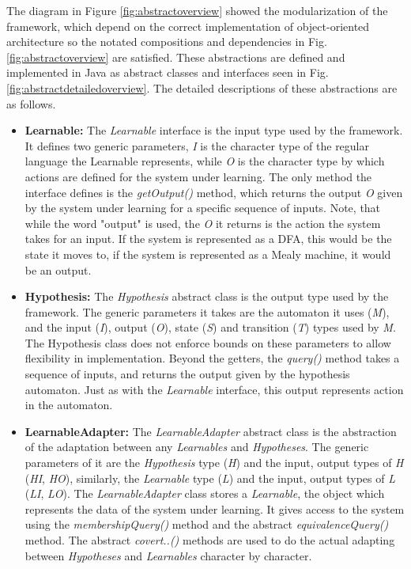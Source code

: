 The diagram in Figure \ref{fig:abstractoverview} showed the modularization of the framework, which depend on the correct implementation of object-oriented architecture so the notated compositions and dependencies in Fig. \ref{fig:abstractoverview} are satisfied. These abstractions are defined and implemented in Java as abstract classes and interfaces seen in Fig. \ref{fig:abstractdetailedoverview}. The detailed descriptions of these abstractions are as follows.
\\
\begin{itemize}
	\item \textbf{Learnable:} The \emph{Learnable} interface is the input type used by the framework. It defines two generic parameters, \emph{I} is the character type of the regular language the Learnable represents, while \emph{O} is the character type by which actions are defined for the system under learning. The only method the interface defines is the \emph{getOutput()} method, which returns the output \emph{O} given by the system under learning for a specific sequence of inputs. Note, that while the word "output" is used, the \emph{O} it returns is the action the system takes for an input. If the system is represented as a DFA, this would be the state it moves to, if the system is represented as a Mealy machine, it would be an output.
	
	\item \textbf{Hypothesis:} The \emph{Hypothesis} abstract class is the output type used by the framework. The generic parameters it takes are the automaton it uses (\emph{M}), and the input (\emph{I}), output (\emph{O}), state (\emph{S}) and transition (\emph{T}) types used by \emph{M}. The Hypothesis class does not enforce bounds on these parameters to allow flexibility in implementation. Beyond the getters, the \emph{query()} method takes a sequence of inputs, and returns the output given by the hypothesis automaton. Just as with the \emph{Learnable} interface, this output represents action in the automaton.
	
	\item \textbf{LearnableAdapter:} The \emph{LearnableAdapter} abstract class is the abstraction of the adaptation between any \emph{Learnables} and \emph{Hypotheses}. The generic parameters of it are the \emph{Hypothesis} type (\emph{H}) and the input, output types of \emph{H} (\emph{HI}, \emph{HO}), similarly, the \emph{Learnable} type (\emph{L}) and the input, output types of \emph{L} (\emph{LI}, \emph{LO}). The \emph{LearnableAdapter} class stores a \emph{Learnable}, the object which represents the data of the system under learning. It gives access to the system using the \emph{membershipQuery()} method and the abstract \emph{equivalenceQuery()} method. The abstract \emph{covert..()} methods are used to do the actual adapting between \emph{Hypotheses} and \emph{Learnables} character by character.
	

\end{itemize}

